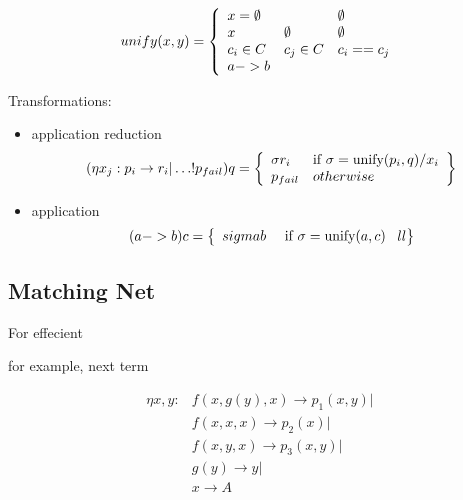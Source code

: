 \documentclass[12pt]{article}
\begin{document}
\begin{itemize}
        $$ unify(x,y) = 
           \left\{\begin{array}{l l l }
             x=\emptyset &              & \emptyset \\
             x           & \emptyset    & \emptyset \\
              c_i \in C  &    c_j \in C & c_i == c_j \\
              a -> b     &              &  \\
           \end{array}\right.
        $$
        
 \end{itemize}


  Transformations:

\begin{itemize}
     \item application reduction
           $$ (\eta x_j : p_i \to r_i| \dots ! p_{fail} ) q = 
                    \left\{\begin{array}{l l}
                             \sigma r_i & \text{if $\sigma=\text{unify}(p_i,q)/x_{i}$} \\
                             p_{fail}   & otherwise \\
                           \end{array}
                    \right\} 
           $$
     \item application 
           $$
             (a->b) c = \left\{
                          \begin{array}{l l}
                             sigma b & \text{ if $\sigma=\text{unify}(a,c) $  }
                          \end{array}{l l}
                        \right\}
           $$
\end{itemize}


\subsection{ Matching Net }

  For effecient 

for example, next term

$$
 \begin{aligned}
  \eta x, y: & f(x,g(y),x)  \to {p_1}(x,y) | \\
                    & f(x,x,x)      \to {p_2}(x) | \\
                    & f(x,y,x)      \to {p_3}(x,y) | \\
                    & g(y)         \to y | \\
                    & x \to A \\
 \end{aligned}       
$$
\end{document}
